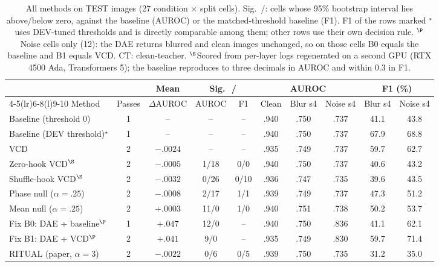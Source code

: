 \documentclass[10pt,a4paper]{article}
\newcommand{\up}{\textuparrow}
\newcommand{\dn}{\textdownarrow}
\begin{document}
\begin{table}[t]
\centering\small
\setlength{\tabcolsep}{4pt}
\caption{All methods on TEST images (27 condition $\times$ split cells). Sig.\ \up/\dn: cells whose 95\% bootstrap interval lies above/below zero, against the baseline (AUROC) or the matched-threshold baseline (F1). F1 of the rows marked $^\star$ uses DEV-tuned thresholds and is directly comparable among them; other rows use their own decision rule. $^\P$Noise cells only (12): the DAE returns blurred and clean images unchanged, so on those cells B0 equals the baseline and B1 equals VCD. CT: clean-teacher. $^\S$Scored from per-layer logs regenerated on a second GPU (RTX 4500 Ada, Transformers 5); the baseline reproduces to three decimals in AUROC and within 0.3 in F1.}
\label{tab:all}
\begin{tabular}{@{}l c c cc ccc cc@{}}
\toprule
 & & Mean & \multicolumn{2}{c}{Sig.\ \up\,/\,\dn} & \multicolumn{3}{c}{AUROC} & \multicolumn{2}{c}{F1 (\%)}\\
\cmidrule(lr){4-5}\cmidrule(lr){6-8}\cmidrule(l){9-10}
Method & Passes & $\Delta$AUROC & AUROC & F1 & Clean & Blur s4 & Noise s4 & Blur s4 & Noise s4\\
\midrule
Baseline (threshold 0)        & 1 & --       & --     & --     & .940 & .750 & .737 & 41.1 & 43.8\\
Baseline (DEV threshold)$^\star$ & 1 & --    & --     & --     & .940 & .750 & .737 & 67.9 & 68.8\\
VCD                           & 2 & $-.0024$ & --     & --     & .935 & .749 & .737 & 59.7 & 62.7\\
\addlinespace
Zero-hook VCD$^\S$            & 2 & $-.0005$ & 1/18   & 0/0    & .940 & .750 & .737 & 40.6 & 43.2\\
Shuffle-hook VCD$^\S$         & 2 & $-.0032$ & 0/26   & 0/10   & .936 & .747 & .735 & 39.6 & 43.5\\
Phase null ($\alpha{=}.25$)   & 2 & $-.0008$ & 2/17   & 1/1    & .939 & .749 & .737 & 47.3 & 51.2\\
Mean null ($\alpha{=}.25$)    & 2 & $+.0003$ & 11/0   & 1/0    & .940 & .751 & .738 & 50.2 & 53.7\\
\addlinespace
Fix B0: DAE + baseline$^\P$   & 1 & $+.047$  & 12/0   & --     & .940 & .750 & .836 & 41.1 & 62.1\\
Fix B1: DAE + VCD$^\P$        & 2 & $+.041$  & 9/0    & --     & .935 & .749 & .830 & 59.7 & 71.4\\
\addlinespace
RITUAL (paper, $\alpha{=}3$)  & 2 & $-.0022$ & 0/6    & 0/5    & .939 & .750 & .735 & 31.2 & 35.0\\

\end{tabular}
\end{table}
\end{document}
